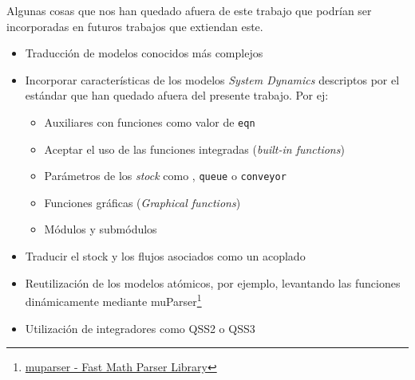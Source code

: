 Algunas cosas que nos han quedado afuera de este trabajo que podrían ser incorporadas en futuros trabajos que extiendan este.

\begin{itemize}
	\item Traducción de modelos conocidos más complejos
	\item Incorporar características de los modelos \textit{System Dynamics} descriptos por el estándar que han quedado afuera del presente trabajo. Por ej:
	\begin{itemize}
		\item Auxiliares con funciones como valor de \texttt{eqn}
		\item Aceptar el uso de las funciones integradas (\textit{built-in functions})
		\item Parámetros de los \textit{stock} como , \texttt{queue} o \texttt{conveyor}
		\item Funciones gráficas (\textit{Graphical functions}) 
		\item Módulos y submódulos
	\end{itemize}
	\item Traducir el stock y los flujos asociados como un acoplado
	\item Reutilización de los modelos atómicos, por ejemplo, levantando las funciones dinámicamente mediante muParser\footnote{\href{http://beltoforion.de/article.php?a=muparser}{muparser - Fast Math Parser Library}} 
	\item Utilización de integradores como QSS2 o QSS3
\end{itemize}